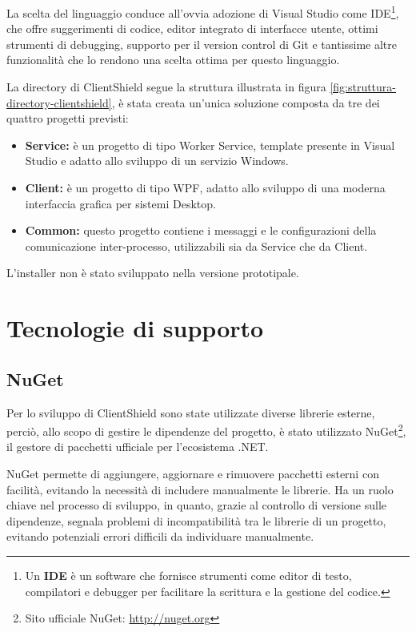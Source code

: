 \documentclass[12pt,a4paper,openright,twoside]{book}
\begin{document}
La scelta del linguaggio conduce all'ovvia adozione di Visual Studio come \gls{IDE}\footnote{Un \textbf{\gls{IDE}} è un software che fornisce strumenti come editor di testo, compilatori e debugger per facilitare la scrittura e la gestione del codice.}, che offre suggerimenti di codice, editor integrato di interfacce utente, ottimi strumenti di debugging, supporto per il version control di Git e tantissime altre funzionalità che lo rendono una scelta ottima per questo linguaggio.

La directory di ClientShield segue la struttura illustrata in figura \ref{fig:struttura-directory-clientshield}, è stata creata un'unica soluzione composta da tre dei quattro progetti previsti:
\begin{itemize}
	\item \textbf{Service:}
	è un progetto di tipo Worker Service, template presente in Visual Studio e adatto allo sviluppo di un servizio Windows.
	
	\item \textbf{Client:}
	è un progetto di tipo \gls{WPF}, adatto allo sviluppo di una moderna interfaccia grafica per sistemi Desktop.
	
	\item \textbf{Common:}
	questo progetto contiene i messaggi e le configurazioni della comunicazione inter-processo, utilizzabili sia da Service che da Client.
\end{itemize}
L'installer non è stato sviluppato nella versione prototipale.

\section{Tecnologie di supporto}

\subsection*{NuGet}

Per lo sviluppo di ClientShield sono state utilizzate diverse librerie esterne, perciò, allo scopo di gestire le dipendenze del progetto, è stato utilizzato NuGet\footnote{Sito ufficiale NuGet: \url{http://nuget.org}}, il gestore di pacchetti ufficiale per l'ecosistema .NET.

NuGet permette di aggiungere, aggiornare e rimuovere pacchetti esterni con facilità, evitando la necessità di includere manualmente le librerie.
Ha un ruolo chiave nel processo di sviluppo, in quanto, grazie al controllo di versione sulle dipendenze, segnala problemi di incompatibilità tra le librerie di un progetto, evitando potenziali errori difficili da individuare manualmente.
\end{document}
